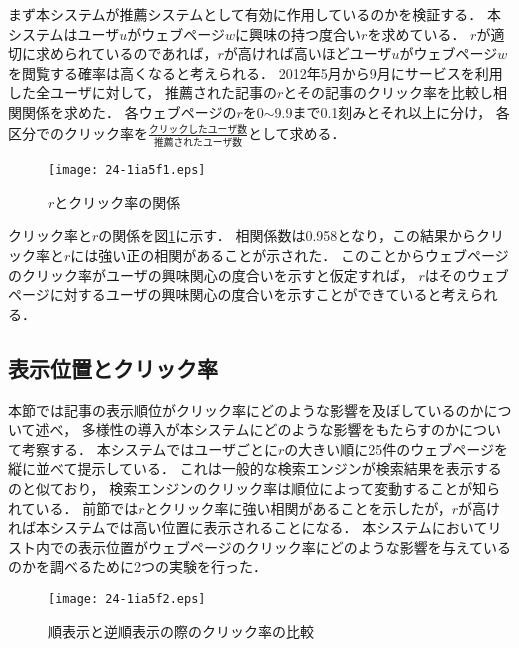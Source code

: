 \documentclass[japanese]{jnlp_1.4}
\begin{document}
まず本システムが推薦システムとして有効に作用しているのかを検証する．
本システムはユーザ$u$がウェブページ$w$に興味の持つ度合い$r$を求めている．
$r$が適切に求められているのであれば，$r$が高ければ高いほどユーザ$u$がウェブページ$w$を閲覧する確率は高くなると考えられる．
2012年5月から9月にサービスを利用した全ユーザに対して，
推薦された記事の$r$とその記事のクリック率を比較し相関関係を求めた．
各ウェブページの$r$を0$\sim$9.9まで0.1刻みとそれ以上に分け，
各区分でのクリック率を$\frac{クリックしたユーザ数}{推薦されたユーザ数}$として求める．

\begin{figure}[t]
\begin{center}
\texttt{[image: 24-1ia5f1.eps]}
\end{center}
\caption{$r$とクリック率の関係}
\label{fig:r_vs_ctr}
\end{figure}

クリック率と$r$の関係を図\ref{fig:r_vs_ctr}に示す．
相関係数は0.958となり，この結果からクリック率と$r$には強い正の相関があることが示された．
このことからウェブページのクリック率がユーザの興味関心の度合いを示すと仮定すれば，
$r$はそのウェブページに対するユーザの興味関心の度合いを示すことができていると考えられる．


\subsection{表示位置とクリック率}

本節では記事の表示順位がクリック率にどのような影響を及ぼしているのかについて述べ，
多様性の導入が本システムにどのような影響をもたらすのかについて考察する．
本システムではユーザごとに$r$の大きい順に25件のウェブページを縦に並べて提示している．
これは一般的な検索エンジンが検索結果を表示するのと似ており，
検索エンジンのクリック率は順位によって変動することが知られている\cite{manning2008introduction}．
前節では$r$とクリック率に強い相関があることを示したが，$r$が高ければ本システムでは高い位置に表示されることになる．
本システムにおいてリスト内での表示位置がウェブページのクリック率にどのような影響を与えているのかを調べるために2つの実験を行った．

\begin{figure}[b]
\begin{center}
\texttt{[image: 24-1ia5f2.eps]}
\end{center}
\caption{順表示と逆順表示の際のクリック率の比較}
\label{fig:reversed}
\end{figure}
\end{document}
